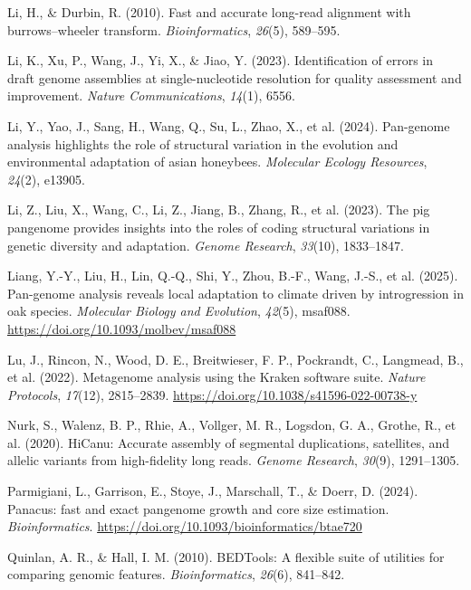 \documentclass[
]{agujournal2019}
\newlength{\cslhangindent}
\newenvironment{CSLReferences}[2] %
 {\begin{list}{}{%
  \setlength{\itemindent}{0pt}
  \setlength{\leftmargin}{0pt}
  \setlength{\parsep}{0pt}
  \ifodd #1
   \setlength{\leftmargin}{\cslhangindent}
   \setlength{\itemindent}{-1\cslhangindent}
  \fi
  \setlength{\itemsep}{#2\baselineskip}}}
 {\end{list}}
\begin{document}
\begin{CSLReferences}{1}{0}
Li, H., \& Durbin, R. (2010). Fast and accurate long-read alignment with
burrows--wheeler transform. \emph{Bioinformatics}, \emph{26}(5),
589--595.

Li, K., Xu, P., Wang, J., Yi, X., \& Jiao, Y. (2023). Identification of
errors in draft genome assemblies at single-nucleotide resolution for
quality assessment and improvement. \emph{Nature Communications},
\emph{14}(1), 6556.

Li, Y., Yao, J., Sang, H., Wang, Q., Su, L., Zhao, X., et al. (2024).
Pan-genome analysis highlights the role of structural variation in the
evolution and environmental adaptation of asian honeybees.
\emph{Molecular Ecology Resources}, \emph{24}(2), e13905.

Li, Z., Liu, X., Wang, C., Li, Z., Jiang, B., Zhang, R., et al. (2023).
The pig pangenome provides insights into the roles of coding structural
variations in genetic diversity and adaptation. \emph{Genome Research},
\emph{33}(10), 1833--1847.

Liang, Y.-Y., Liu, H., Lin, Q.-Q., Shi, Y., Zhou, B.-F., Wang, J.-S., et
al. (2025). Pan-genome analysis reveals local adaptation to climate
driven by introgression in oak species. \emph{Molecular Biology and
Evolution}, \emph{42}(5), msaf088.
\url{https://doi.org/10.1093/molbev/msaf088}

Lu, J., Rincon, N., Wood, D. E., Breitwieser, F. P., Pockrandt, C.,
Langmead, B., et al. (2022). Metagenome analysis using the Kraken
software suite. \emph{Nature Protocols}, \emph{17}(12), 2815--2839.
\url{https://doi.org/10.1038/s41596-022-00738-y}

Nurk, S., Walenz, B. P., Rhie, A., Vollger, M. R., Logsdon, G. A.,
Grothe, R., et al. (2020). HiCanu: Accurate assembly of segmental
duplications, satellites, and allelic variants from high-fidelity long
reads. \emph{Genome Research}, \emph{30}(9), 1291--1305.

Parmigiani, L., Garrison, E., Stoye, J., Marschall, T., \& Doerr, D.
(2024). Panacus: fast and exact pangenome growth and core size
estimation. \emph{Bioinformatics}.
\url{https://doi.org/10.1093/bioinformatics/btae720}

Quinlan, A. R., \& Hall, I. M. (2010). BEDTools: A flexible suite of
utilities for comparing genomic features. \emph{Bioinformatics},
\emph{26}(6), 841--842.


\end{CSLReferences}
\end{document}
